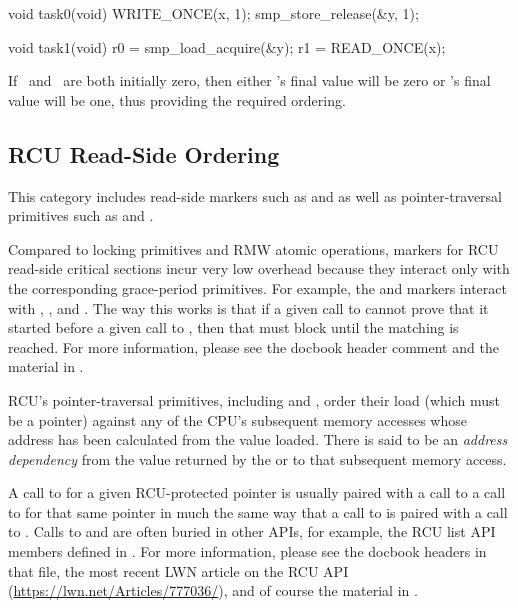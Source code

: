\begin{VerbatimU}
	void task0(void)
	{
		WRITE_ONCE(x, 1);
		smp_store_release(&y, 1);
	}

	void task1(void)
	{
		r0 = smp_load_acquire(&y);
		r1 = READ_ONCE(x);
	}
\end{VerbatimU}

If~ and~ are both initially zero, then either 's final
value will be zero or 's final value will be one, thus providing
the required ordering.


\subsection{RCU Read-Side Ordering}

This category includes read-side markers such as 
and  as well as pointer-traversal primitives such as
 and .

Compared to locking primitives and RMW atomic operations, markers
for RCU read-side critical sections incur very low overhead because
they interact only with the corresponding grace-period primitives.
For example, the  and  markers interact
with , , and .
The way this works is that if a given call to  cannot
prove that it started before a given call to , then
that  must block until the matching 
is reached.
For more information, please see the 
docbook header comment and the material in .

RCU's pointer-traversal primitives, including  and
, order their load (which must be a pointer) against any
of the CPU's subsequent memory accesses whose address has been calculated
from the value loaded.
There is said to be an \emph{address dependency} from the value returned by
the  or  to that subsequent
memory access.

A call to  for a given RCU-protected pointer is
usually paired with a call to a call to  for that
same pointer in much the same way that a call to  is
paired with a call to .
Calls to  and  are often
buried in other APIs, for example, the RCU list API members defined in
.
For more information, please see the docbook headers in that file, the most
recent LWN article on the RCU API (\url{https://lwn.net/Articles/777036/}),
and of course the material in .

